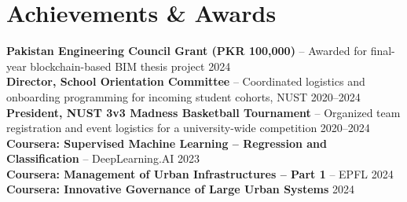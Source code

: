 \documentclass[a4paper,11pt]{article}
\begin{document}
\section{Achievements \& Awards}
 \begin{itemize}[leftmargin=0.15in, label={}]
    \small{\item{
     \textbf{Pakistan Engineering Council Grant (PKR 100,000)} -- Awarded for final-year blockchain-based BIM thesis project \hfill 2024 \\
     \textbf{Director, School Orientation Committee} -- Coordinated logistics and onboarding programming for incoming student cohorts, NUST \hfill 2020--2024 \\
     \textbf{President, NUST 3v3 Madness Basketball Tournament} -- Organized team registration and event logistics for a university-wide competition \hfill 2020--2024 \\
     \textbf{Coursera: Supervised Machine Learning -- Regression and Classification} -- DeepLearning.AI \hfill 2023 \\
     \textbf{Coursera: Management of Urban Infrastructures -- Part 1} -- EPFL \hfill 2024 \\
     \textbf{Coursera: Innovative Governance of Large Urban Systems} \hfill 2024
    }}
 \end{itemize}


\end{document}
